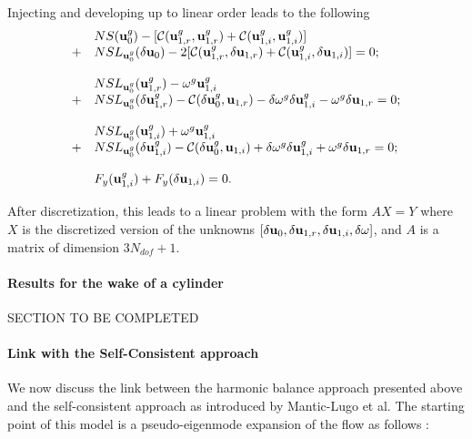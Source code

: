 \documentclass[twocolumn,10pt]{asme2ej}
\begin{document}
Injecting and developing up to linear order leads to the following 
\begin{equation}
\begin{array}{ll}
\displaystyle
& NS(  {\bf u }_0^g ) - [ {\cal C}( {\bf u }_{1,r}^g,{\bf u }_{1,r}^g) +  {\cal C}( {\bf u }_{1,i}^g,{\bf u }_{1,i}^g) ]
\\
+& NSL_{{\bf u }_0^g}(\delta {\bf u }_0) - 2 [ {\cal C}( {\bf u }_{1,r}^g,\delta {\bf u }_{1,r}) +  {\cal C}( {\bf u }_{1,i}^g,\delta {\bf u }_{1,i}) ] = 0;
\\
\\
&  NSL_{{\bf u }_0^g}( {\bf u }_{1,r}^g) - \omega^g {\bf u }_{1,i}^g 
 \\
  +& NSL_{{\bf u }_0^g}( \delta {\bf u }_{1,r}^g) 
   -  {\cal C}( \delta {\bf u }_{0}^g, {\bf u }_{1,r})
   - \delta \omega^g \delta {\bf u }_{1,i}^g 
 - \omega^g \delta {\bf u }_{1,r} = 0 ;
 \\
\\
&  NSL_{{\bf u }_0^g}({\bf u }_{1,i}^g) + \omega^g {\bf u }_{1,i}^g
 \\
  +& NSL_{{\bf u }_0^g}( \delta {\bf u }_{1,i}^g) 
  -  {\cal C}( \delta {\bf u }_{0}^g, {\bf u }_{1,i}) 
  + \delta \omega^g \delta {\bf u }_{1,i}^g 
+ \omega^g \delta {\bf u }_{1,r} = 0 ;
\\
\\
& F_y({\bf u }_{1,i}^g) + F_y(\delta {\bf u }_{1,i}) = 0.
 \end{array}
\end{equation}

After discretization, this leads to a linear problem with the form $A X = Y$ where $X$ is the discretized version of the unknowns  $[\delta {\bf u }_0, \delta {\bf u }_{1,r}, \delta {\bf u }_{1,i}, \delta \omega]$, and $A$ is a matrix of dimension $3 N_{dof} +1$. 
 


\paragraph{Results for the wake of a cylinder}

SECTION TO BE COMPLETED

\paragraph{Link with the Self-Consistent approach}

We now discuss the link between the harmonic balance approach presented above and the self-consistent approach as introduced by Mantic-Lugo et al.
The starting point of this model is a pseudo-eigenmode expansion of the flow as follows :
\end{document}
